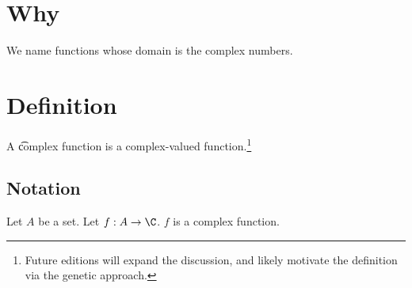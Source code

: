 

\section*{Why}

We name functions whose domain is the complex numbers.

\section*{Definition}

A \t{complex function} is a complex-valued function.\footnote{Future editions will expand the discussion, and likely motivate the definition via the genetic approach.}

\subsection*{Notation}

Let $A$ be a set.
Let $f: A \to \C $.
$f$ is a complex function.

\blankpage